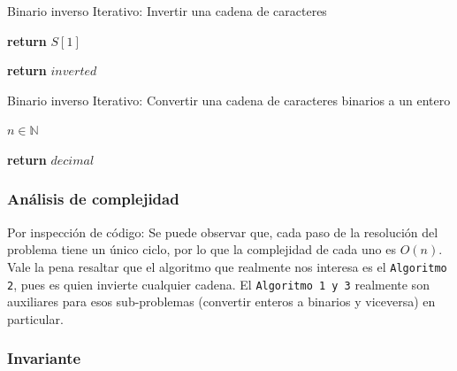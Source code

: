 \documentclass[letter]{article}
\begin{document}
\begin{algorithm}[!htb]
\caption{Binario inverso Iterativo: Invertir una cadena de caracteres}
\begin{algorithmic}[1]
      \State \textbf{return} $S[1]$
      \EndIf

    \EndFor
  \State \textbf{return} $inverted$
\EndProcedure
\end{algorithmic}
\end{algorithm}


\begin{algorithm}[!htb]
\caption{Binario inverso Iterativo: Convertir una cadena de caracteres binarios a un entero}
\begin{algorithmic}[1]
\Ensure $n \in \mathbb{N} $
      
    \EndFor
  \State \textbf{return} $decimal$
\EndProcedure
\end{algorithmic}
\end{algorithm}




\subsubsection{Análisis de complejidad} \label{algoritmos:inocente:complejidad}

Por inspección de código: Se puede observar que, cada paso de la resolución del problema tiene un único ciclo, por lo que la complejidad de cada uno es $O(n)$. Vale la pena resaltar que el algoritmo que realmente nos interesa es el \texttt{Algoritmo 2}, pues es quien invierte cualquier cadena. El \texttt{Algoritmo 1 y 3} realmente son auxiliares para esos sub-problemas (convertir enteros a binarios y viceversa) en particular.

\newpage

\subsubsection{Invariante} \label{algoritmos:inocente:invariante}
\end{document}
